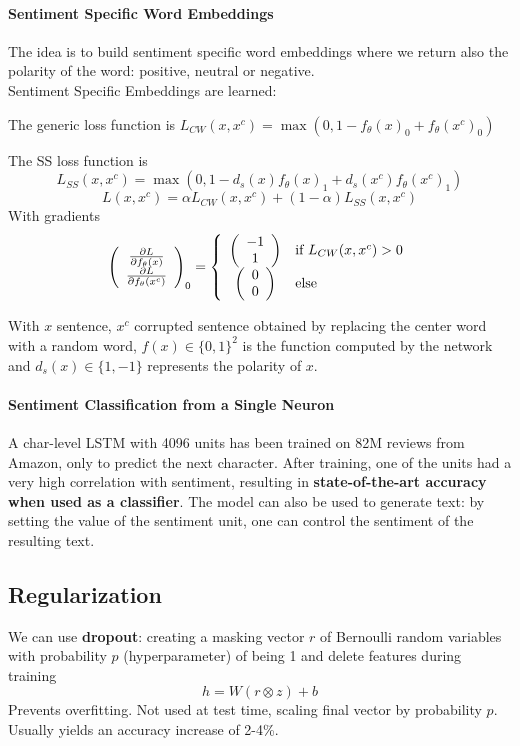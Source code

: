 \documentclass[10pt]{report}
\begin{document}
\paragraph{Sentiment Specific Word Embeddings} The idea is to build sentiment specific word embeddings where we return also the polarity of the word: positive, neutral or negative.\\
Sentiment Specific Embeddings are learned:
\begin{list}{}{}
	\item The generic loss function is $L_{CW}(x, x^c) = \max(0, 1-f_\theta(x)_0 + f_\theta(x^c)_0)$
	\item The SS loss function is
	$$L_{SS}(x, x^c) = \max(0, 1 - d_s(x)f_\theta(x)_1 + d_s(x^c)f_\theta(x^c)_1)$$
	$$L(x,x^c) = \alpha L_{CW}(x,x^c)+(1-\alpha)L_{SS}(x,x^c)$$
	With gradients
	$$\left(\begin{array}{c}
	\frac{\partial L}{\partial f_\theta(x)}\\
	\frac{\partial L}{\partial f_\theta(x^c)}
	\end{array}\right)_0 = \left\{\begin{array}{cl}
	\left(\begin{array}{c}
	-1\\1
	\end{array}\right)&\hbox{if }L_{CW}(x, x^c) > 0\\
	\left(\begin{array}{c}
	0\\0
	\end{array}\right)&\hbox{else}\\
	\end{array}\right.$$
\end{list}
With $x$ sentence, $x^c$ corrupted sentence obtained by replacing the center word with a random word, $f(x)\in \{0,1\}^2$ is the function computed by the network and $d_s(x)\in\{1,-1\}$ represents the polarity of $x$.
\paragraph{Sentiment Classification from a Single Neuron} A char-level LSTM with 4096 units has been trained on 82M reviews from Amazon, only to predict the next character. After training, one of the units had a very high correlation with sentiment, resulting in \textbf{state-of-the-art accuracy when used as a classifier}. The model can also be used to generate text: by setting the value of the sentiment unit, one can control the sentiment of the resulting text.
\subsection{Regularization} 
We can use \textbf{dropout}: creating a masking vector $r$ of Bernoulli random variables with probability $p$ (hyperparameter) of being 1 and delete features during training $$h = W(r\otimes z) + b$$
Prevents overfitting. Not used at test time, scaling final vector by probability $p$. Usually yields an accuracy increase of 2-4\%.
\end{document}
